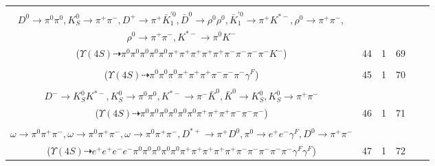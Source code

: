 \documentclass[landscape]{article}
\newcounter{rownumbers}
\newcommand\rn{\stepcounter{rownumbers}\arabic{rownumbers}}
\newcommand{\EOLP}{\\ \hline} %
\newcommand{\topoTags}[1]{#1} %
\begin{document}
\begin{longtable}{clcccc}
\rn & \makecell[l]{ $ 
\Upsilon(4S) \rightarrow B^{0} \bar{B}^{0} ,
B^{0} \rightarrow K^{0} D^{*+} D^{*-} ,
\bar{B}^{0} \rightarrow \pi^{0} D^{0} ,
K^{0} \rightarrow K_{S}^{0} ,
D^{*+} \rightarrow \pi^{0} D^{+} ,
D^{*-} \rightarrow \pi^{-} \bar{D}^{0} ,
$ \\ $
D^{0} \rightarrow \pi^{0} \pi^{0} ,
K_{S}^{0} \rightarrow \pi^{+} \pi^{-} ,
D^{+} \rightarrow \pi^{+} \bar{K}_1^{'0} ,
\bar{D}^{0} \rightarrow \rho^{0} \rho^{0} ,
\bar{K}_1^{'0} \rightarrow \pi^{+} K^{*-} ,
\rho^{0} \rightarrow \pi^{+} \pi^{-} ,
$ \\ $
\rho^{0} \rightarrow \pi^{+} \pi^{-} ,
K^{*-} \rightarrow \pi^{0} K^{-} 
$ \\ ($
\Upsilon(4S) \dashrightarrow \pi^{0} \pi^{0} \pi^{0} \pi^{0} \pi^{0} \pi^{+} \pi^{+} \pi^{+} \pi^{+} \pi^{+} \pi^{-} \pi^{-} \pi^{-} \pi^{-} K^{-} 
$) } & \topoTags{44 & }1 & 69 \EOLP

\rn & \makecell[l]{ $ 
\Upsilon(4S) \rightarrow B^{0} \bar{B}^{0} ,
B^{0} \rightarrow \pi^{+} \pi^{+} \pi^{-} D^{-} ,
\bar{B}^{0} \rightarrow \pi^{0} D^{0} ,
D^{-} \rightarrow \rho^{0} \pi^{-} \gamma^{F} ,
D^{0} \rightarrow \pi^{0} \pi^{0} ,
\rho^{0} \rightarrow \pi^{+} \pi^{-} 
$ \\ ($
\Upsilon(4S) \dashrightarrow \pi^{0} \pi^{0} \pi^{0} \pi^{+} \pi^{+} \pi^{+} \pi^{-} \pi^{-} \pi^{-} \gamma^{F} 
$) } & \topoTags{45 & }1 & 70 \EOLP

\rn & \makecell[l]{ $ 
\Upsilon(4S) \rightarrow B^{0} \bar{B}^{0} ,
B^{0} \rightarrow \rho^{0} \pi^{+} D^{*-} ,
\bar{B}^{0} \rightarrow \pi^{0} D^{0} ,
\rho^{0} \rightarrow \pi^{+} \pi^{-} ,
D^{*-} \rightarrow \pi^{0} D^{-} ,
D^{0} \rightarrow \pi^{0} \pi^{0} ,
$ \\ $
D^{-} \rightarrow K_{S}^{0} K^{*-} ,
K_{S}^{0} \rightarrow \pi^{0} \pi^{0} ,
K^{*-} \rightarrow \pi^{-} \bar{K}^{0} ,
\bar{K}^{0} \rightarrow K_{S}^{0} ,
K_{S}^{0} \rightarrow \pi^{+} \pi^{-} 
$ \\ ($
\Upsilon(4S) \dashrightarrow \pi^{0} \pi^{0} \pi^{0} \pi^{0} \pi^{0} \pi^{0} \pi^{+} \pi^{+} \pi^{+} \pi^{-} \pi^{-} \pi^{-} 
$) } & \topoTags{46 & }1 & 71 \EOLP

\rn & \makecell[l]{ $ 
\Upsilon(4S) \rightarrow \bar{B}^{0} \bar{B}^{0} ,
\bar{B}^{0} \rightarrow \pi^{0} D^{0} ,
\bar{B}^{0} \rightarrow \rho^{-} \omega \omega \omega D^{*+} ,
\pi^{0} \rightarrow e^{+} e^{-} \gamma^{F} ,
D^{0} \rightarrow \pi^{0} \pi^{0} ,
\rho^{-} \rightarrow \pi^{0} \pi^{-} ,
$ \\ $
\omega \rightarrow \pi^{0} \pi^{+} \pi^{-} ,
\omega \rightarrow \pi^{0} \pi^{+} \pi^{-} ,
\omega \rightarrow \pi^{0} \pi^{+} \pi^{-} ,
D^{*+} \rightarrow \pi^{+} D^{0} ,
\pi^{0} \rightarrow e^{+} e^{-} \gamma^{F} ,
D^{0} \rightarrow \pi^{+} \pi^{-} 
$ \\ ($
\Upsilon(4S) \dashrightarrow e^{+} e^{+} e^{-} e^{-} \pi^{0} \pi^{0} \pi^{0} \pi^{0} \pi^{0} \pi^{+} \pi^{+} \pi^{+} \pi^{+} \pi^{+} \pi^{-} \pi^{-} \pi^{-} \pi^{-} \pi^{-} \gamma^{F} \gamma^{F} 
$) } & \topoTags{47 & }1 & 72 \EOLP


\end{longtable}
\end{document}
